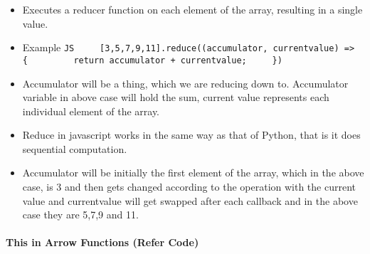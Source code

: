 \documentclass[
  paper=a4,
  ,captions=tableheading
]{scrartcl}
\providecommand{\tightlist}{%
  \setlength{\itemsep}{0pt}\setlength{\parskip}{0pt}}
\begin{document}
\begin{itemize}
\tightlist
\item
  Executes a reducer function on each element of the array, resulting in
  a single value.
\item
  Example
  \texttt{JS\ \ \ \ \ {[}3,5,7,9,11{]}.reduce((accumulator,\ currentvalue)\ =\textgreater{}\{\ \ \ \ \ \ \ \ \ return\ accumulator\ +\ currentvalue;\ \ \ \ \ \})}
\item
  Accumulator will be a thing, which we are reducing down to.
  Accumulator variable in above case will hold the sum, current value
  represents each individual element of the array.
\item
  Reduce in javascript works in the same way as that of Python, that is
  it does sequential computation.
\item
  Accumulator will be initially the first element of the array, which in
  the above case, is 3 and then gets changed according to the operation
  with the current value and currentvalue will get swapped after each
  callback and in the above case they are 5,7,9 and 11.
\end{itemize}

\hypertarget{this-in-arrow-functions-refer-code}{%
\paragraph{This in Arrow Functions (Refer
Code)}\label{this-in-arrow-functions-refer-code}}
\end{document}
